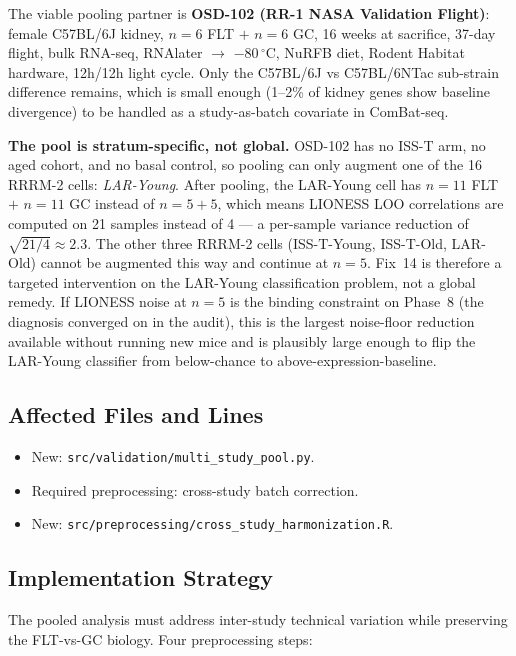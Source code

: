 \documentclass[11pt]{article}
\newcommand{\code}[1]{\texttt{#1}}
\begin{document}
The viable pooling partner is \textbf{OSD-102 (RR-1 NASA Validation Flight)}: female C57BL/6J kidney, $n{=}6$ FLT $+$ $n{=}6$ GC, 16 weeks at sacrifice, 37-day flight, bulk RNA-seq, RNAlater $\to$ $-80\,^\circ$C, NuRFB diet, Rodent Habitat hardware, 12h/12h light cycle. Only the C57BL/6J vs C57BL/6NTac sub-strain difference remains, which is small enough (1--2\% of kidney genes show baseline divergence) to be handled as a study-as-batch covariate in ComBat-seq.

\textbf{The pool is stratum-specific, not global.} OSD-102 has no ISS-T arm, no aged cohort, and no basal control, so pooling can only augment one of the 16 RRRM-2 cells: \emph{LAR-Young}. After pooling, the LAR-Young cell has $n{=}11$ FLT $+$ $n{=}11$ GC instead of $n{=}5{+}5$, which means LIONESS LOO correlations are computed on 21 samples instead of 4 --- a per-sample variance reduction of $\sqrt{21/4}\approx 2.3$. The other three RRRM-2 cells (ISS-T-Young, ISS-T-Old, LAR-Old) cannot be augmented this way and continue at $n{=}5$. Fix~14 is therefore a targeted intervention on the LAR-Young classification problem, not a global remedy. If LIONESS noise at $n{=}5$ is the binding constraint on Phase~8 (the diagnosis converged on in the audit), this is the largest noise-floor reduction available without running new mice and is plausibly large enough to flip the LAR-Young classifier from below-chance to above-expression-baseline.

\subsection{Affected Files and Lines}

\begin{itemize}[leftmargin=*]
\item New: \code{src/validation/multi\_study\_pool.py}.
\item Required preprocessing: cross-study batch correction.
\item New: \code{src/preprocessing/cross\_study\_harmonization.R}.
\end{itemize}

\subsection{Implementation Strategy}

The pooled analysis must address inter-study technical variation while preserving the FLT-vs-GC biology. Four preprocessing steps:
\end{document}

